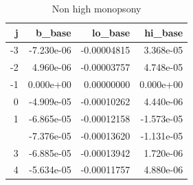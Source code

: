\begin{table}

\caption{Non high monopsony}
\centering
\begin{tabular}[t]{rrrr}
\toprule
j & b\_base & lo\_base & hi\_base\\
\midrule
-3 & -7.230e-06 & -0.00004815 & 3.368e-05\\
-2 & 4.960e-06 & -0.00003757 & 4.748e-05\\
-1 & 0.000e+00 & 0.00000000 & 0.000e+00\\
0 & -4.909e-05 & -0.00010262 & 4.440e-06\\
1 & -6.865e-05 & -0.00012158 & -1.573e-05\\
\addlinespace
2 & -7.376e-05 & -0.00013620 & -1.131e-05\\
3 & -6.885e-05 & -0.00013942 & 1.720e-06\\
4 & -5.634e-05 & -0.00011757 & 4.880e-06\\
\bottomrule
\end{tabular}
\end{table}
